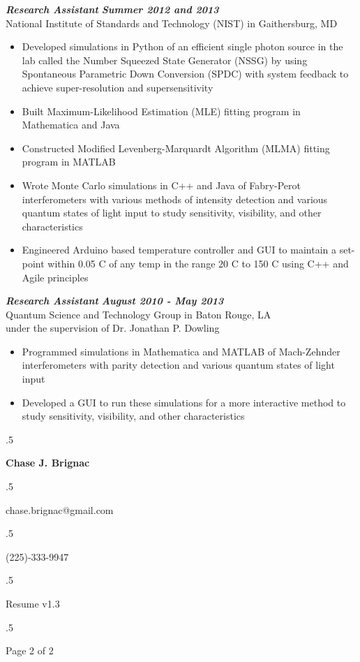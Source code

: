 \documentclass{res}
\begin{document}
\begin{resume}
        {\bfseries {\em Research Assistant}} \hfill {\bfseries{\em Summer 2012 and 2013}} \\
National Institute of Standards and Technology (NIST) in Gaithersburg, MD
                 \begin{itemize}  \itemsep -2pt
                 \item Developed simulations in Python of an efficient single photon source in the lab called the Number Squeezed State Generator (NSSG) by using Spontaneous Parametric Down Conversion (SPDC) with system feedback to achieve super-resolution and supersensitivity
		\item Built Maximum-Likelihood Estimation (MLE) fitting program in Mathematica and Java
	 	\item Constructed Modified Levenberg-Marquardt Algorithm (MLMA) fitting program in MATLAB
	 	\item Wrote Monte Carlo simulations in C++ and Java of Fabry-Perot interferometers with various methods of intensity detection and various quantum states of light input to study sensitivity, visibility, and other characteristics
		\item Engineered Arduino based temperature controller and GUI to maintain a set-point within 0.05 C of any temp in the range 20 C to 150 C using C++ and Agile principles
                 \end{itemize}
                 
        {\bfseries {\em  Research Assistant}}  \hfill  {\bfseries{\em August 2010 - May 2013}} \\
		Quantum Science and Technology Group in Baton Rouge, LA \\                 
                 under the supervision of Dr. Jonathan P. Dowling
                 \begin{itemize}  \itemsep -2pt %
		\item Programmed simulations in Mathematica and MATLAB of Mach-Zehnder \\ interferometers with parity detection and various quantum states of light input
		\item Developed a GUI to run these simulations for a more interactive method to study sensitivity, visibility, and other characteristics 
                 \end{itemize}
                 
                 \newpage
                 
 \moveleft.5\hoffset\centerline{\large\bf Chase J. Brignac}
\moveleft.5\hoffset\centerline{chase.brignac@gmail.com}
\moveleft.5\hoffset\centerline{(225)-333-9947}
\moveleft.5\hoffset\centerline{Resume v1.3}
\moveleft.5\hoffset\centerline{Page 2 of 2}


\end{resume}
\end{document}
